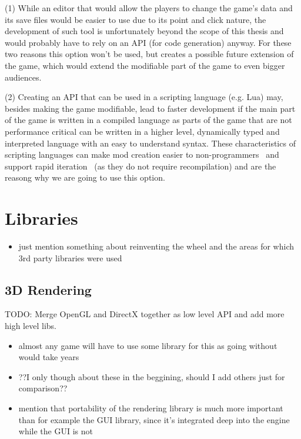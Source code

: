(1) While an editor that would allow the players to change the game's data and its save files would be easier to use due to its
point and click nature, the development of such tool is unfortunately beyond the scope of this thesis and would probably have to rely
on an API (for code generation) anyway. For these two reasons this option won't be used, but creates a possible future extension of the game,
which would extend the modifiable part of the game to even bigger audiences.

(2) Creating an API that can be used in a scripting language (e.g. Lua) may, besides making the game modifiable, lead to faster
development if the main part of the game is written in a compiled language as parts of the game that are not performance critical
can be written in a higher level, dynamically typed and interpreted language with an easy to understand syntax. 
These characteristics of scripting languages can make mod creation easier to non-programmers~\cite{WhyScripting} and support
rapid iteration~\cite{GEA} (as they do not require recompilation) and are the reasong why we are going to use this option.

\section{Libraries}

\begin{itemize}
    \item just mention something about reinventing the wheel and
        the areas for which 3rd party libraries were used
\end{itemize}

\subsection{3D Rendering}

TODO: Merge OpenGL and DirectX together as low level API and add more high level libs.
\begin{itemize}
    \item almost any game will have to use some library for this as
        going without would take years
    \item ??I only though about these in the beggining, should I add
        others just for comparison??
    \item mention that portability of the rendering library is much more
        important than for example the GUI library, since it's integrated
        deep into the engine while the GUI is not
\end{itemize}


